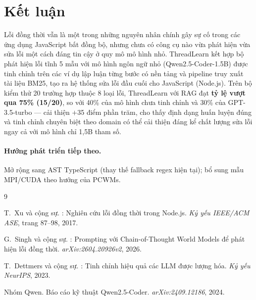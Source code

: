 \documentclass[12pt]{article}
\begin{document}
\section{Kết luận}
\label{sec:ketluan}

Lỗi đồng thời vẫn là một trong những nguyên nhân chính gây sự cố trong các ứng
dụng JavaScript bất đồng bộ, nhưng chưa có công cụ nào vừa phát hiện vừa sửa lỗi
một cách đáng tin cậy ở quy mô mô hình nhỏ.
ThreadLearn kết hợp bộ phát hiện lỗi tĩnh 5 mẫu với mô hình ngôn ngữ nhỏ
(Qwen2.5-Coder-1.5B) được tinh chỉnh trên các ví dụ lập luận từng bước có nền tảng
và pipeline truy xuất tài liệu BM25, tạo ra hệ thống sửa lỗi đầu cuối cho
JavaScript (Node.js).
Trên bộ kiểm thử 20 trường hợp thuộc 8 loại lỗi, ThreadLearn với RAG đạt
\textbf{tỷ lệ vượt qua 75\% (15/20)}, so với 40\% của mô hình chưa tinh chỉnh và
30\% của GPT-3.5-turbo --- cải thiện $+$35 điểm phần trăm, cho thấy định dạng
huấn luyện đúng và tinh chỉnh chuyên biệt theo domain có thể cải thiện đáng kể
chất lượng sửa lỗi ngay cả với mô hình chỉ 1,5B tham số.

\paragraph{Hướng phát triển tiếp theo.}
Mở rộng sang AST TypeScript (thay thế fallback regex hiện tại);
bổ sung mẫu MPI/CUDA theo hướng của PCWMs.

\begin{thebibliography}{9}

  T.\ Xu và cộng sự.
  : Nghiên cứu lỗi đồng thời trong Node.js.
  \newblock \emph{Kỷ yếu IEEE/ACM ASE}, trang 87--98, 2017.

  G.\ Singh và cộng sự.
  : Prompting với Chain-of-Thought World Models để phát hiện
  lỗi đồng thời.
  \newblock \emph{arXiv:2604.20926v2}, 2026.

  T.\ Dettmers và cộng sự.
  : Tinh chỉnh hiệu quả các LLM được lượng hóa.
  \newblock \emph{Kỷ yếu NeurIPS}, 2023.

  Nhóm Qwen.
  \newblock Báo cáo kỹ thuật {Qwen2.5-Coder}.
  \newblock \emph{arXiv:2409.12186}, 2024.

\end{thebibliography}
\end{document}
